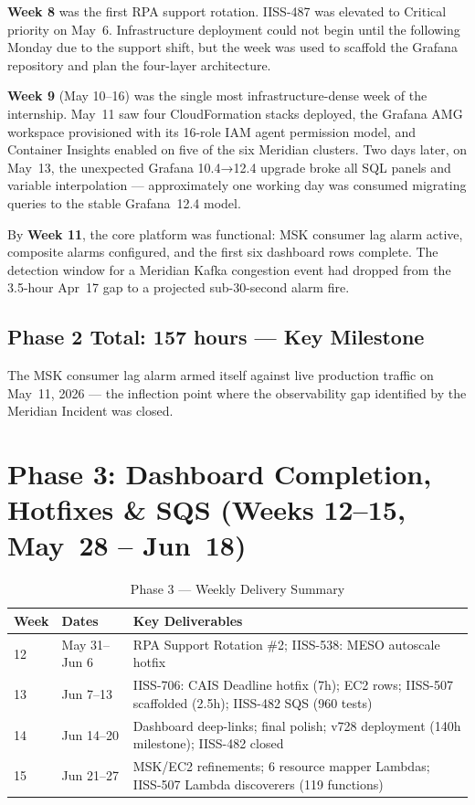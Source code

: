 \textbf{Week 8} was the first RPA support rotation. IISS-487 was elevated
to Critical priority on May~6. Infrastructure deployment could not begin
until the following Monday due to the support shift, but the week was used
to scaffold the Grafana repository and plan the four-layer architecture.

\textbf{Week 9} (May 10--16) was the single most infrastructure-dense week
of the internship. May~11 saw four CloudFormation stacks deployed, the Grafana
AMG workspace provisioned with its 16-role IAM agent permission model, and
Container Insights enabled on five of the six Meridian clusters. Two days
later, on May~13, the unexpected Grafana 10.4→12.4 upgrade broke all SQL
panels and variable interpolation --- approximately one working day was
consumed migrating queries to the stable Grafana~12.4 model.

By \textbf{Week 11}, the core platform was functional: MSK consumer lag
alarm active, composite alarms configured, and the first six dashboard rows
complete. The detection window for a Meridian Kafka congestion event had
dropped from the 3.5-hour Apr~17 gap to a projected sub-30-second alarm fire.

\subsection{Phase 2 Total: 157 hours --- Key Milestone}

The MSK consumer lag alarm armed itself against live production traffic
on May~11, 2026 --- the inflection point where the observability gap
identified by the Meridian Incident was closed.

\section{Phase 3: Dashboard Completion, Hotfixes \& SQS (Weeks 12--15, May~28 -- Jun~18)}
\label{sec:wb_phase3}

\begin{table}[ht]
\centering
\caption{Phase 3 --- Weekly Delivery Summary}
\label{tab:wb_phase3}
\begin{tabular}{p{1.2cm}p{4.0cm}p{7.5cm}}
\toprule
\textbf{Week} & \textbf{Dates} & \textbf{Key Deliverables} \\
\midrule
12 & May 31--Jun 6 & RPA Support Rotation \#2; IISS-538: MESO autoscale hotfix \\
13 & Jun 7--13 & IISS-706: CAIS Deadline hotfix (7h); EC2 rows; IISS-507 scaffolded (2.5h); IISS-482 SQS (960 tests) \\
14 & Jun 14--20 & Dashboard deep-links; final polish; v728 deployment (140h milestone); IISS-482 closed \\
15 & Jun 21--27 & MSK/EC2 refinements; 6 resource mapper Lambdas; IISS-507 Lambda discoverers (119 functions) \\
\bottomrule
\end{tabular}
\end{table}

